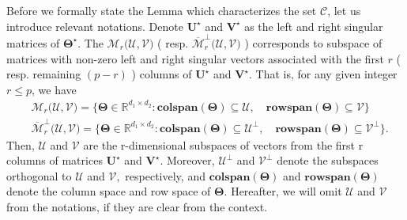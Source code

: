 \documentclass[alpha-refs]{wiley-article}
\begin{document}
Before we formally state the Lemma which characterizes the set $\mathcal{C}$, let us introduce relevant notations. 
Denote $\boldsymbol{U}^{\star}$ and $\boldsymbol{V}^{\star}$ as the left and right singular matrices of $\boldsymbol{\Theta}^{\star}$.
The $\mathcal{M}_{r}\big( \mathcal{U}, \mathcal{V} \big)$ ( resp. $\overline{\mathcal{M}}_{r}^{\perp}\big( \mathcal{U}, \mathcal{V} \big)$ ) corresponds to subspace of matrices with non-zero left and right singular vectors associated with the first $r$ ( resp.  remaining $(p-r)$ ) columns of $\boldsymbol{U}^{\star}$ and $\boldsymbol{V}^{\star}$.
That is, for any given integer $r\leq p$, we have
\begin{align*}
    &\mathcal{M}_{r}\big( \mathcal{U}, \mathcal{V} \big) = \big\{ \boldsymbol{\Theta}\in\mathbb{R}^{d_{1} \times d_{2}} : \textbf{colspan}(\boldsymbol{\Theta}) \subseteq \mathcal{U},\quad  \textbf{rowspan}(\boldsymbol{\Theta}) \subseteq \mathcal{V}  \big\} \\
    &\overline{\mathcal{M}}_{r}^{\perp}\big( \mathcal{U}, \mathcal{V} \big) = \big\{ \boldsymbol{\Theta}\in\mathbb{R}^{d_{1} \times d_{2}} : \textbf{colspan}(\boldsymbol{\Theta}) \subseteq \mathcal{U}^{\perp},\quad  \textbf{rowspan}(\boldsymbol{\Theta}) \subseteq \mathcal{V}^{\perp} \big\}.
\end{align*}
Then, $\mathcal{U}$ and $\mathcal{V}$ are the r-dimensional subspaces of vectors from the first r columns of matrices $\boldsymbol{U}^{\star}$ and $\boldsymbol{V}^{\star}$. 
Moreover, $\mathcal{U}^{\perp}$ and $\mathcal{V}^{\perp}$ denote the subspaces orthogonal to  $\mathcal{U}$ and $\mathcal{V},$ respectively, and $\textbf{colspan}(\boldsymbol{\Theta})$ and $\textbf{rowspan}(\boldsymbol{\Theta})$ denote the column space and row space of $\boldsymbol{\Theta}$.
Hereafter, we will omit $\mathcal{U}$ and $\mathcal{V}$ from the notations, if they are clear from the context. 
\end{document}
